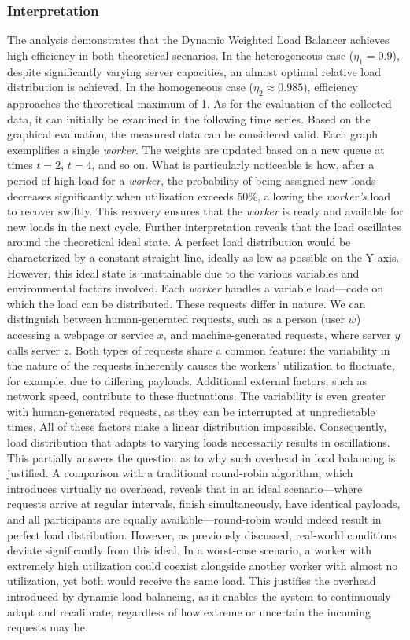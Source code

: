 \documentclass[twocolumn]{webofc}
\begin{document}
\subsubsection{Interpretation}
The analysis demonstrates that the Dynamic Weighted Load Balancer achieves high efficiency in both theoretical scenarios. In the heterogeneous case (\(\eta_1 = 0.9\)), despite significantly varying server capacities, an almost optimal relative load distribution is achieved. In the homogeneous case (\(\eta_2 \approx 0.985\)), efficiency approaches the theoretical maximum of 1. As for the evaluation of the collected data, it can initially be examined in the following time series. Based on the graphical evaluation, the measured data can be considered valid. Each graph exemplifies a single \textit{worker}. The weights are updated based on a new queue at times \(t=2\), \(t=4\), and so on. What is particularly noticeable is how, after a period of high load for a \textit{worker}, the probability of being assigned new loads decreases significantly when utilization exceeds \(50\%\), allowing the \textit{worker's} load to recover swiftly. This recovery ensures that the \textit{worker} is ready and available for new loads in the next cycle. Further interpretation reveals that the load oscillates around the theoretical ideal state. A perfect load distribution would be characterized by a constant straight line, ideally as low as possible on the Y-axis. However, this ideal state is unattainable due to the various variables and environmental factors involved. Each \textit{worker} handles a variable load—code on which the load can be distributed. These requests differ in nature. We can distinguish between human-generated requests, such as a person (user \(w\)) accessing a webpage or service \(x\), and machine-generated requests, where server \(y\) calls server \(z\). Both types of requests share a common feature: the variability in the nature of the requests inherently causes the workers' utilization to fluctuate, for example, due to differing payloads. Additional external factors, such as network speed, contribute to these fluctuations. The variability is even greater with human-generated requests, as they can be interrupted at unpredictable times. All of these factors make a linear distribution impossible. Consequently, load distribution that adapts to varying loads necessarily results in oscillations. This partially answers the question as to why such overhead in load balancing is justified. A comparison with a traditional round-robin algorithm, which introduces virtually no overhead\cite{arpaci-dusseau2014operating}, reveals that in an ideal scenario—where requests arrive at regular intervals, finish simultaneously, have identical payloads, and all participants are equally available—round-robin would indeed result in perfect load distribution. However, as previously discussed, real-world conditions deviate significantly from this ideal. In a worst-case scenario, a worker with extremely high utilization could coexist alongside another worker with almost no utilization, yet both would receive the same load. This justifies the overhead introduced by dynamic load balancing, as it enables the system to continuously adapt and recalibrate, regardless of how extreme or uncertain the incoming requests may be.
\end{document}
